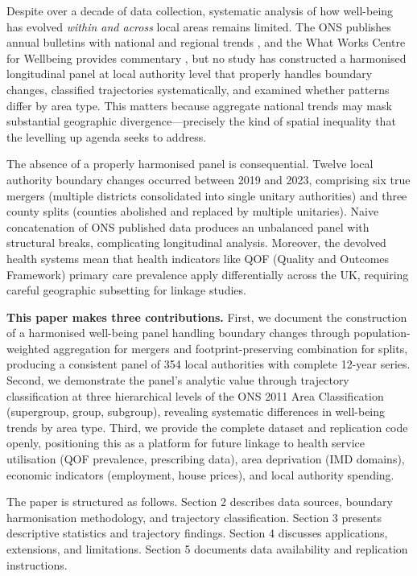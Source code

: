 \documentclass[12pt,a4paper]{article}
\begin{document}
Despite over a decade of data collection, systematic analysis of how well-being has evolved \textit{within and across} local areas remains limited. The ONS publishes annual bulletins with national and regional trends , and the What Works Centre for Wellbeing provides commentary , but no study has constructed a harmonised longitudinal panel at local authority level that properly handles boundary changes, classified trajectories systematically, and examined whether patterns differ by area type. This matters because aggregate national trends may mask substantial geographic divergence---precisely the kind of spatial inequality that the levelling up agenda seeks to address.

The absence of a properly harmonised panel is consequential. Twelve local authority boundary changes occurred between 2019 and 2023, comprising six true mergers (multiple districts consolidated into single unitary authorities) and three county splits (counties abolished and replaced by multiple unitaries). Naive concatenation of ONS published data produces an unbalanced panel with structural breaks, complicating longitudinal analysis. Moreover, the devolved health systems mean that health indicators like QOF (Quality and Outcomes Framework) primary care prevalence apply differentially across the UK, requiring careful geographic subsetting for linkage studies.

\textbf{This paper makes three contributions.} First, we document the construction of a harmonised well-being panel handling boundary changes through population-weighted aggregation for mergers and footprint-preserving combination for splits, producing a consistent panel of 354 local authorities with complete 12-year series. Second, we demonstrate the panel's analytic value through trajectory classification at three hierarchical levels of the ONS 2011 Area Classification (supergroup, group, subgroup), revealing systematic differences in well-being trends by area type. Third, we provide the complete dataset and replication code openly, positioning this as a platform for future linkage to health service utilisation (QOF prevalence, prescribing data), area deprivation (IMD domains), economic indicators (employment, house prices), and local authority spending.

The paper is structured as follows. Section 2 describes data sources, boundary harmonisation methodology, and trajectory classification. Section 3 presents descriptive statistics and trajectory findings. Section 4 discusses applications, extensions, and limitations. Section 5 documents data availability and replication instructions.
\end{document}

